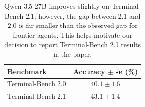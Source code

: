 \documentclass{llmxive}
\begin{document}
\begin{table}[!htbp]
\centering
\begin{tabular}{lc}
\toprule
Benchmark & Accuracy $\pm$ se (\%) \\
\midrule
Terminal-Bench 2.0 & $40.1 \pm 1.6$ \\
Terminal-Bench 2.1 & $43.1 \pm 1.4$ \\
\bottomrule
\end{tabular}
\label{tab:tb21}
\caption{Qwen 3.5-27B improves slightly on Terminal-Bench 2.1; however, the gap between 2.1 and 2.0 is far smaller than the observed gap for frontier agents. This helps motivate our decision to report Terminal-Bench 2.0 results in the paper.}
\end{table}




% 
\end{document}
